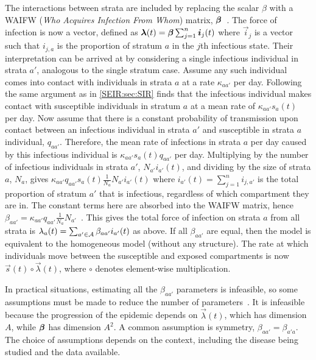 \documentclass[thesis.tex]{subfiles}
\begin{document}
The interactions between strata are included by replacing the scalar $\beta$ with a WAIFW (\emph{Who Acquires Infection From Whom}) matrix, $\bm{\beta}$~\autocite[58]{keelingModeling}.
The force of infection is now a vector, defined as $\bm{\lambda}(t) = \bm{\beta} \sum_{j=1}^n \bm{i}_j(t)$ where $\vec{i}_j$ is a vector such that $i_{j,a}$ is the proportion of stratum $a$ in the $j$th infectious state.
Their interpretation can be arrived at by considering a single infectious individual in strata $a'$, analogous to the single stratum case.
Assume any such individual comes into contact with individuals in strata $a$ at a rate $\kappa_{aa'}$ per day.
Following the same argument as in \cref{SEIR:sec:SIR} finds that the infectious individual makes contact with susceptible individuals in stratum $a$ at a mean rate of $\kappa_{aa'} s_a(t)$ per day.
Now assume that there is a constant probability of transmission upon contact between an infectious individual in strata $a'$ and susceptible in strata $a$ individual, $q_{aa'}$.
Therefore, the mean rate of infections in strata $a$ per day caused by this infectious individual is $\kappa_{aa'} s_a(t) q_{aa'}$ per day.
Multiplying by the number of infectious individuals in strata $a'$, $N_{a'} i_{a'}(t)$, and dividing by the size of strata $a$, $N_a$, gives $\kappa_{aa'} q_{aa'} s_a(t) \frac{1}{N_a} N_{a'} i_{a'}(t)$ where $i_{a'}(t) = \sum_{j=1}^n i_{j,a'}$ is the total proportion of stratum $a'$ that is infectious, regardless of which compartment they are in.
The constant terms here are absorbed into the WAIFW matrix, hence $\beta_{aa'} = \kappa_{aa'} q_{aa'} \frac{1}{N_a} N_{a'}$~\autocite[section 9.2]{diekmannMathematical}.
This gives the total force of infection on strata $a$ from all strata is $\lambda_a(t) = \sum_{a' \in \mathcal{A}} \beta_{aa'} i_{a'}(t)$ as above.
If all $\beta_{aa'}$ are equal, then the model is equivalent to the homogeneous model (\ie without any structure).
The rate at which individuals move between the susceptible and exposed compartments is now $\vec{s}(t) \circ \vec\lambda(t)$, where $\circ$ denotes element-wise multiplication.

In practical situations, estimating all the $\beta_{aa'}$ parameters is infeasible, so some assumptions must be made to reduce the number of parameters~\autocite[176]{andersonInfectious}.
It is infeasible because the progression of the epidemic depends on $\vec{\lambda}(t)$, which has dimension $A$, while $\bm{\beta}$ has dimension $A^2$.
A common assumption is symmetry, \ie $\beta_{aa'} = \beta_{a'a}$.
The choice of assumptions depends on the context, including the disease being studied and the data available.
\end{document}
